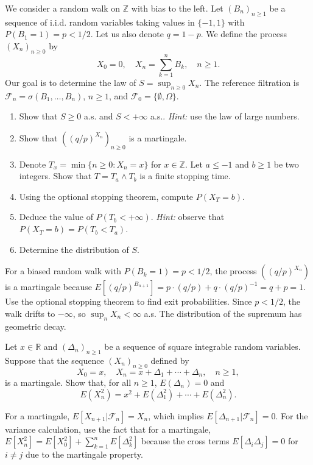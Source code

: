 \begin{exercise}
We consider a random walk on \(\mathbb{Z}\) with bias to the left. Let \((B_n)_{n \geq 1}\) be a sequence of i.i.d. random variables taking values in \(\{-1, 1\}\) with \(P(B_1 = 1) = p < 1/2\). Let us also denote \(q = 1 - p\). We define the process \((X_n)_{n \geq 0}\) by
\[X_0 = 0, \quad X_n = \sum_{k=1}^n B_k, \quad n \geq 1.\]
Our goal is to determine the law of \(S = \sup_{n \geq 0} X_n\). The reference filtration is \(\mathcal{F}_n = \sigma(B_1, \ldots, B_n)\), \(n \geq 1\), and \(\mathcal{F}_0 = \{\emptyset, \Omega\}\).
\begin{enumerate}
    \item Show that \(S \geq 0\) a.s. and \(S < +\infty\) a.s..
    \textit{Hint:} use the law of large numbers.

    \item Show that \(((q/p)^{X_n})_{n \geq 0}\) is a martingale.

    \item Denote \(T_x = \min\{n \geq 0 : X_n = x\}\) for \(x \in \mathbb{Z}\). Let \(a \leq -1\) and \(b \geq 1\) be two integers. Show that \(T = T_a \wedge T_b\) is a finite stopping time.

    \item Using the optional stopping theorem, compute \(P(X_T = b)\).

    \item Deduce the value of \(P(T_b < +\infty)\).
    \textit{Hint:} observe that \(P(X_T = b) = P(T_b < T_a)\).

    \item Determine the distribution of \(S\).
\end{enumerate}

\begin{reminder}
For a biased random walk with \(P(B_k = 1) = p < 1/2\), the process \(((q/p)^{X_n})\) is a martingale because \(E[(q/p)^{B_{n+1}}] = p \cdot (q/p) + q \cdot (q/p)^{-1} = q + p = 1\). Use the optional stopping theorem to find exit probabilities. Since \(p < 1/2\), the walk drifts to \(-\infty\), so \(\sup_n X_n < \infty\) a.s. The distribution of the supremum has geometric decay.
\end{reminder}
\end{exercise}

\begin{exercise}
Let \(x \in \mathbb{R}\) and \((\Delta_n)_{n \geq 1}\) be a sequence of square integrable random variables. Suppose that the sequence \((X_n)_{n \geq 0}\) defined by
\[X_0 = x, \quad X_n = x + \Delta_1 + \cdots + \Delta_n, \quad n \geq 1,\]
is a martingale. Show that, for all \(n \geq 1\), \(E(\Delta_n) = 0\) and
\[E(X_n^2) = x^2 + E(\Delta_1^2) + \cdots + E(\Delta_n^2).\]

\begin{reminder}
For a martingale, \(E[X_{n+1}|\mathcal{F}_n] = X_n\), which implies \(E[\Delta_{n+1}|\mathcal{F}_n] = 0\). For the variance calculation, use the fact that for a martingale, \(E[X_n^2] = E[X_0^2] + \sum_{k=1}^n E[\Delta_k^2]\) because the cross terms \(E[\Delta_i \Delta_j] = 0\) for \(i \neq j\) due to the martingale property.
\end{reminder}
\end{exercise}

